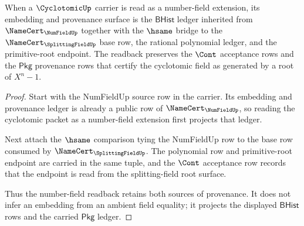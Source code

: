 \begin{theorem}
\label{thm:cyclotomic-numfield-embedding-ledger}
When a $\CyclotomicUp$ carrier is read as a number-field extension, its embedding and provenance surface is the $\mathsf{BHist}$ ledger inherited from $\NameCert_{\NumFieldUp}$ together with the $\hsame$ bridge to the $\NameCert_{\SplittingFieldUp}$ base row, the rational polynomial ledger, and the primitive-root endpoint. The readback preserves the $\Cont$ acceptance rows and the $\mathsf{Pkg}$ provenance rows that certify the cyclotomic field as generated by a root of $X^n-1$.
\end{theorem}
\begin{proof}
Start with the NumFieldUp source row in the carrier. Its embedding and provenance ledger is already a public row of $\NameCert_{\NumFieldUp}$, so reading the cyclotomic packet as a number-field extension first projects that ledger.

Next attach the $\hsame$ comparison tying the NumFieldUp row to the base row consumed by $\NameCert_{\SplittingFieldUp}$. The polynomial row and primitive-root endpoint are carried in the same tuple, and the $\Cont$ acceptance row records that the endpoint is read from the splitting-field root surface.

Thus the number-field readback retains both sources of provenance. It does not infer an embedding from an ambient field equality; it projects the displayed $\mathsf{BHist}$ rows and the carried $\mathsf{Pkg}$ ledger.
\end{proof}

